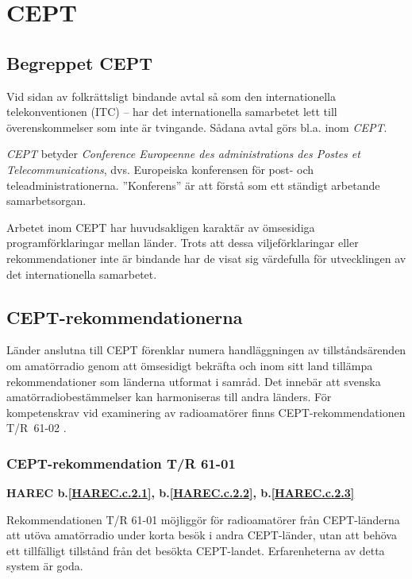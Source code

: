 
\section{CEPT}

\subsection{Begreppet CEPT}

Vid sidan av folkrättsligt bindande avtal så som den internationella
telekonventionen (ITC) -- har det internationella samarbetet lett till
överenskommelser som inte är tvingande.
Sådana avtal görs bl.a. inom \emph{CEPT}.

\emph{CEPT} betyder \emph{Conference Europeenne des administrations des
	Postes et Telecommunications}, dvs. Europeiska konferensen
för post- och teleadministrationerna. ''Konferens'' är att förstå som
ett ständigt arbetande samarbetsorgan.

Arbetet inom CEPT har huvudsakligen karaktär av ömsesidiga programförklaringar
mellan länder.
Trots att dessa viljeförklaringar eller rekommendationer inte är bindande har de
visat sig värdefulla för utvecklingen av det internationella samarbetet.

\subsection{CEPT-rekommendationerna}

Länder anslutna till CEPT förenklar numera handläggningen av
tillståndsärenden om amatörradio genom att ömsesidigt bekräfta och
inom sitt land tillämpa rekommendationer som länderna utformat i
samråd.
Det innebär att svenska amatörradiobestämmelser kan harmoniseras till andra
länders.
För kompetenskrav vid examinering av radioamatörer finns CEPT-rekommendationen
T/R~61-02 \cite{TR6102}.

\subsubsection{CEPT-rekommendation T/R 61-01}
\textbf{
HAREC b.\ref{HAREC.c.2.1}\label{myHAREC.c.2.1},
 b.\ref{HAREC.c.2.2}\label{myHAREC.c.2.2},
 b.\ref{HAREC.c.2.3}\label{myHAREC.c.2.3}
}

Rekommendationen T/R 61-01 \cite{TR6101} möjliggör för radioamatörer från CEPT-länderna att utöva amatörradio under korta besök i andra CEPT-länder, utan att behöva ett tillfälligt tillstånd från det besökta CEPT-landet.
Erfarenheterna av detta system är goda.

